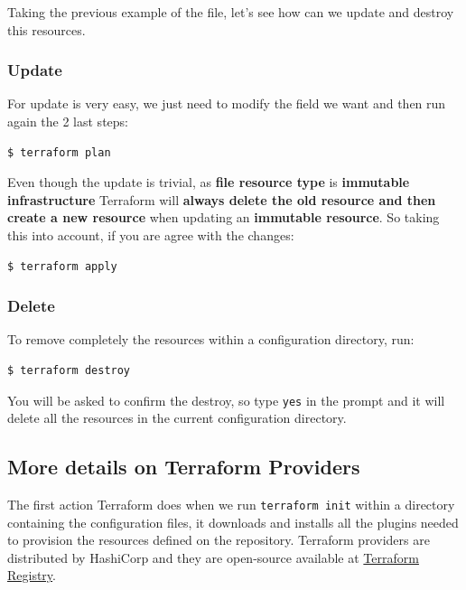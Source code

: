 \documentclass{article}
\newenvironment{codetemplate}[1][]{%
  \mybasecolorbox[#1]
  \itshape
}{%
  \endmybasecolorbox
}
\begin{document}
Taking the previous example of the file, let's see how can we update and destroy this resources. 

\subsubsection{Update}
For update is very easy, we just need to modify the field we want and then run again the 2 last steps:
\begin{codetemplate}{}
\begin{verbatim}
$ terraform plan
\end{verbatim}
\end{codetemplate}

Even though the update is trivial, as \textbf{file resource type} is \textbf{immutable infrastructure} Terraform will \textbf{always delete the old resource and then create a new resource} when updating an \textbf{immutable resource}. So taking this into account, if you are agree with the changes:
\begin{codetemplate}{}
\begin{verbatim}
$ terraform apply
\end{verbatim}
\end{codetemplate}

\subsubsection{Delete}
To remove completely the resources within a configuration directory, run:
\begin{codetemplate}{}
\begin{verbatim}
$ terraform destroy
\end{verbatim}
\end{codetemplate}

You will be asked to confirm the destroy, so type \verb+yes+ in the prompt and it will delete all the resources in the current configuration directory.


\subsection{More details on Terraform Providers}
The first action Terraform does when we run \verb|terraform init| within a directory containing the configuration files, it downloads and installs all the plugins needed to provision the resources defined on the repository. Terraform providers are distributed by HashiCorp and they are open-source available at \href{https://registry.terraform.io/}{Terraform Registry}.
\end{document}
